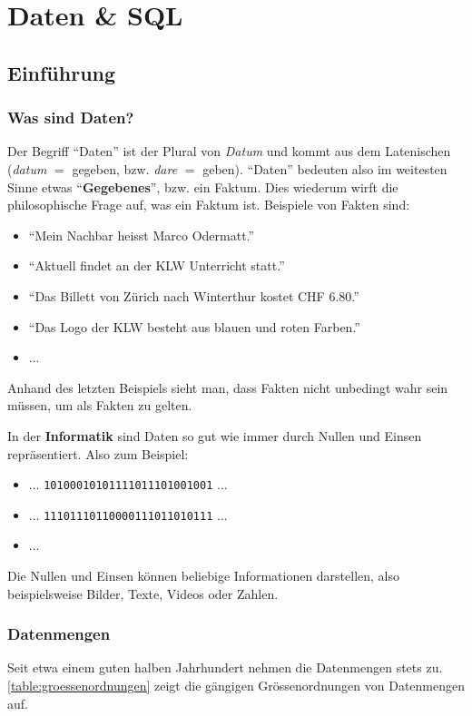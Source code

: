 \chapter{Daten \& SQL}\label{ch:Lektion}
\section{Einführung}

\subsection{Was sind Daten?}

Der Begriff \enquote{Daten} ist der Plural von \textit{Datum} und kommt aus dem Latenischen (\textit{datum} $=$ gegeben,
bzw. \textit{dare} $=$ geben). \enquote{Daten} bedeuten also im weitesten Sinne etwas \enquote{\textbf{Gegebenes}}, bzw. ein Faktum. Dies wiederum wirft die philosophische Frage auf, was ein Faktum ist. Beispiele von Fakten sind:
\begin{itemize}
  \item \enquote{Mein Nachbar heisst Marco Odermatt.}
  \item \enquote{Aktuell findet an der KLW Unterricht statt.}
  \item \enquote{Das Billett von Zürich nach Winterthur kostet CHF 6.80.}
  \item \enquote{Das Logo der KLW besteht aus blauen und roten Farben.}
  \item $\ldots$
\end{itemize}
Anhand des letzten Beispiels sieht man, dass Fakten nicht unbedingt wahr sein müssen, um als Fakten zu gelten.

In der \textbf{Informatik} sind Daten so gut wie immer durch Nullen und Einsen repräsentiert. Also zum Beispiel:
\begin{itemize}
  \item $\ldots$ \verb|10100010101111011101001001| $\ldots$
  \item $\ldots$ \verb|11101110110000111011010111| $\ldots$
  \item $\ldots$
\end{itemize}
Die Nullen und Einsen können beliebige Informationen darstellen, also beispielsweise Bilder, Texte, Videos oder Zahlen.

\subsection{Datenmengen}
Seit etwa einem guten halben Jahrhundert nehmen die Datenmengen stets zu. \cref{table:groessenordnungen} zeigt die gängigen Grössenordnungen von Datenmengen auf.

